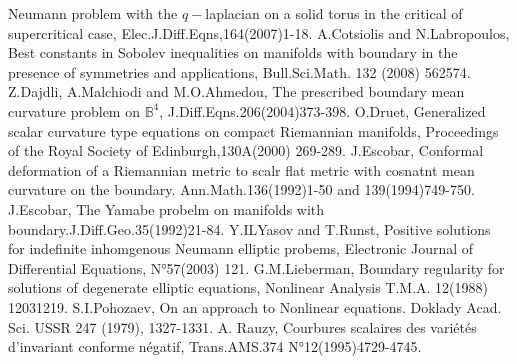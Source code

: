 \documentclass{Tran-l}
\theoremstyle{definition}
\theoremstyle{remark}
\numberwithin{equation}{section}
\begin{document}
\begin{thebibliography}{11}
Neumann problem with the $q-$laplacian on a solid torus in the
critical of supercritical case, Elec.J.Diff.Eqns,164(2007)1-18.
 A.Cotsiolis and N.Labropoulos,
Best constants in Sobolev inequalities on manifolds with boundary in
the presence of symmetries and applications, Bull.Sci.Math. 132
(2008) 562574.
Z.Dajdli, A.Malchiodi and
M.O.Ahmedou, The prescribed boundary mean curvature problem on
$\mathbb{B}^4$, J.Diff.Eqns.206(2004)373-398.
O.Druet, Generalized scalar curvature type equations
on compact Riemannian manifolds, Proceedings of the Royal Society of
Edinburgh,130A(2000) 269-289.
 J.Escobar, Conformal deformation of a Riemannian
metric to scalr flat metric with cosnatnt mean curvature on the
boundary. Ann.Math.136(1992)1-50 and 139(1994)749-750.
 J.Escobar, The Yamabe probelm on manifolds with
boundary.J.Diff.Geo.35(1992)21-84.
 Y.ILYasov  and T.Runst,
Positive solutions for indefinite inhomgenous Neumann elliptic
probems, Electronic Journal of Differential Equations, N°57(2003)
121.
G.M.Lieberman, Boundary regularity for solutions of degenerate elliptic
equations, Nonlinear Analysis T.M.A. 12(1988) 12031219.
S.I.Pohozaev, On an approach to Nonlinear equations. Doklady Acad. Sci. USSR
247 (1979), 1327-1331.
A. Rauzy, Courbures scalaires des variétés d'invariant
conforme négatif, Trans.AMS.374 N°12(1995)4729-4745.
\end{thebibliography}
\end{document}
